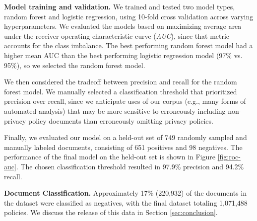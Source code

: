 \textbf{Model training and validation.}
We trained and tested two model types, random forest and logistic regression, using 10-fold cross validation across varying hyperparameters. We evaluated the models based on maximizing average area under the receiver operating characteristic curve (\textit{AUC}), since that metric accounts for the class imbalance. The best performing random forest model had a higher mean AUC than the best performing logistic regression model (97\% vs. 95\%), so we selected the random forest model.

We then considered the tradeoff between precision and recall for the random forest model. We manually selected a classification threshold that prioritized precision over recall, since we anticipate uses of our corpus (e.g., many forms of automated analysis) that may be more sensitive to erroneously including non-privacy policy documents than erroneously omitting privacy policies.

Finally, we evaluated our model on a held-out set of 749 randomly sampled and manually labeled documents, consisting of 651 positives and 98 negatives. The performance of the final model on the held-out set is shown in Figure \ref{fig:roc-auc}. The chosen classification threshold resulted in 97.9\% precision and 94.2\% recall.

\textbf{Document Classification.}
Approximately 17\% (220,932) of the documents in the dataset were classified as negatives, with the final dataset totaling 1,071,488 policies. We discuss the release of this data in Section \ref{sec:conclusion}.

